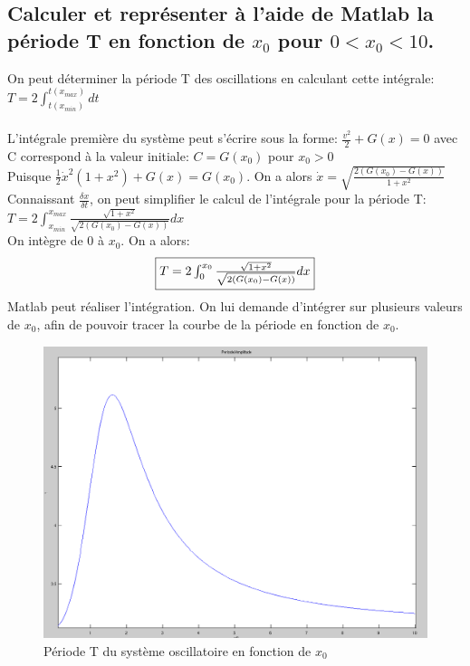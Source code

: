 \documentclass[10pt,a4paper]{article}
\begin{document}
\subsection{Calculer et représenter à l'aide de Matlab la période T en fonction de $x_0$ pour $0<x_0<10$.}
On peut déterminer la période T des oscillations en calculant cette intégrale:\\
$T=2\int_{t(x_{min})}^{t(x_{max})} dt $\\
\\
L'intégrale première du système peut s'écrire sous la forme: $ \frac{v^2}{2} + G(x) = 0 $ avec  \\
C correspond à la valeur initiale: $C=G(x_0)$ pour $x_0>0$\\
Puisque $ \frac{1}{2}\dot{x}^2(1 + x^2) + G(x) = G(x_0) $. On a alors $\dot{x} = \sqrt{\frac{2(G(x_0) - G(x))}{1 + x^2}}$\\
Connaissant $\frac{\delta x}{\delta t}$, on peut simplifier le calcul de l'intégrale pour la période T:\\
$T=2\int_{x_{min}}^{x_{max}} \frac{\sqrt{1 + x^2}}{\sqrt{2(G(x_0) - G(x))}} dx $\\
On intègre de 0 à $x_0$. On a alors:
\[\fbox{$ T=2\int_{0}^{x_0} \frac{\sqrt{1 + x^2}}{\sqrt{2(G(x_0) - G(x))}} dx $}\]
Matlab peut réaliser l'intégration. On lui demande d'intégrer sur plusieurs valeurs de $x_0$, afin de pouvoir tracer la courbe de la période en fonction de $x_0$.

\begin{figure}[H]
	\includegraphics[scale=0.5]{PeriodePendule.png}
	\caption{Période T du système oscillatoire en fonction de $x_0$}
\end{figure} 
\end{document}
